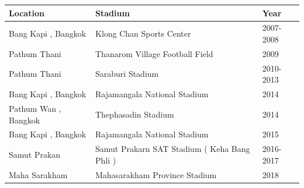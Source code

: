 \documentclass{article}
\begin{document}
\begin{tabular}{lll}
\toprule
Location & Stadium & Year \\
\midrule
Bang Kapi , Bangkok & Klong Chan Sports Center & 2007-2008 \\
Pathum Thani & Thanarom Village Football Field & 2009 \\
Pathum Thani & Saraburi Stadium & 2010-2013 \\
Bang Kapi , Bangkok & Rajamangala National Stadium & 2014 \\
Pathum Wan , Bangkok & Thephasadin Stadium & 2014 \\
Bang Kapi , Bangkok & Rajamangala National Stadium & 2015 \\
Samut Prakan & Samut Prakarn SAT Stadium ( Keha Bang Phli ) & 2016-2017 \\
Maha Sarakham & Mahasarakham Province Stadium & 2018 \\
\bottomrule
\end{tabular}
\end{document}
